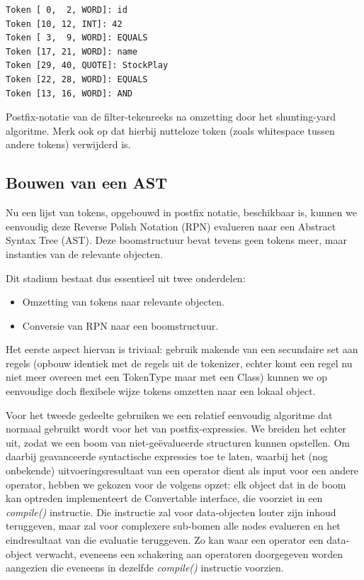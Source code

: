 \begin{code}
\begin{verbatim}
Token [ 0,  2, WORD]: id
Token [10, 12, INT]: 42
Token [ 3,  9, WORD]: EQUALS
Token [17, 21, WORD]: name
Token [29, 40, QUOTE]: StockPlay
Token [22, 28, WORD]: EQUALS
Token [13, 16, WORD]: AND
\end{verbatim}
\caption{Postfix-notatie van de filter-tekenreeks na omzetting door het shunting-yard algoritme. Merk ook op dat hierbij nutteloze token (zoals whitespace tussen andere tokens) verwijderd is.}
\end{code}

\subsection{Bouwen van een AST}

Nu een lijst van tokens, opgebouwd in postfix notatie, beschikbaar is, kunnen we eenvoudig deze Reverse Polish Notation (RPN) evalueren naar een Abstract Syntax Tree (AST). Deze boomstructuur bevat tevens geen tokens meer, maar instanties van de relevante objecten.

Dit stadium bestaat dus essentieel uit twee onderdelen:
\begin{itemize}
\item Omzetting van tokens naar relevante objecten.
\item Conversie van RPN naar een boomstructuur.
\end{itemize}

Het eerste aspect hiervan is triviaal: gebruik makende van een secundaire set aan regels (opbouw identiek met de regels uit de tokenizer, echter komt een regel nu niet meer overeen met een TokenType maar met een Class) kunnen we op eenvoudige doch flexibele wijze tokens omzetten naar een lokaal object.

Voor het tweede gedeelte gebruiken we een relatief eenvoudig algoritme dat normaal gebruikt wordt voor het  van postfix-expressies. We breiden het echter uit, zodat we een boom van niet-ge\"evalueerde structuren kunnen opstellen. Om daarbij geavanceerde syntactische expressies toe te laten, waarbij het (nog onbekende) uitvoeringsresultaat van een operator dient als input voor een andere operator, hebben we gekozen voor de volgens opzet: elk object dat in de boom kan optreden implementeert de Convertable interface, die voorziet in een \emph{compile()} instructie. Die instructie zal voor data-objecten louter zijn inhoud teruggeven, maar zal voor complexere sub-bomen alle nodes evalueren en het eindresultaat van die evaluatie teruggeven. Zo kan waar een operator een data-object verwacht, eveneens een schakering aan operatoren doorgegeven worden aangezien die eveneens in dezelfde \emph{compile()} instructie voorzien.

